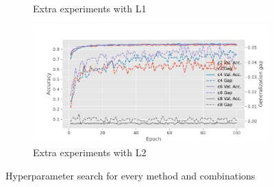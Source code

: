 {{\begin{figure}[t]
\begin{subfigure}{.4\linewidth}
        \caption{Extra experiments with L1}
        \label{fig:extra1}
    \end{subfigure}
        \begin{subfigure}{.4\linewidth}
        \centering
        \includegraphics[width=\linewidth]{figures/Combinations with L2.pdf}
        \caption{Extra experiments with L2}
        \label{fig:extra2}
    \end{subfigure}
    \caption{Hyperparameter search for every method and combinations}
    \label{fig:hp_search}
\end{figure}

}
}


\newcommand{\questionTableOne} {
\youranswer{
Question Table 1 - Fill in Table 1 with the results from your experiments varying the number of hidden units.

\begin{table}[t]
    \centering
    \begin{tabular}{c|cc}
    \toprule
        \# hidden units & val. acc. & generalization gap \\
    \midrule
         32            &     0.785    &             0.148        \\
         64            &     0.811     &            0.339       \\
         128           &     0.808     &            0.782        \\
    \bottomrule
    \end{tabular}
    \caption{Validation accuracy (\%) and generalization gap (in terms of cross-entropy error) for varying network widths on the EMNIST dataset.}
    \label{tab:width_exp}
\end{table}
}
}

